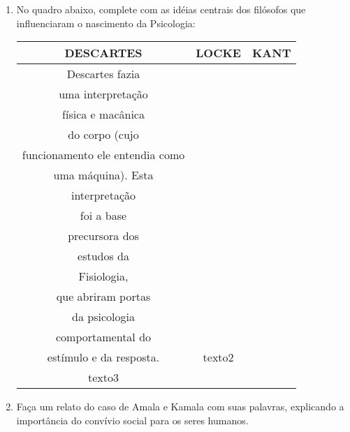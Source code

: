 \documentclass[a4paper, 12pt]{article}
\begin{document}
\begin{enumerate}
\item No quadro abaixo, complete com as idéias centrais dos filósofos que influenciaram o nascimento da Psicologia: \newline \newline
  \centering
  \begin{tabular}{|c|c|c|}
    \hline
    \textbf{DESCARTES} & \textbf{LOCKE} & \textbf{KANT} \\ \hline
    Descartes fazia \\
    uma interpretação \\
    física e macânica \\
    do corpo (cujo  \\
    funcionamento ele
    entendia como   \\
    uma máquina). Esta\\
    interpretação  \\
    foi a base \\
    precursora dos \\
    estudos da \\
    Fisiologia, \\
    que abriram portas \\
    da psicologia \\
    comportamental do   \\
    estímulo e da resposta. & texto2 &\\
    texto3 \\ \hline
  \end{tabular} \newline
  
\item Faça um relato do caso de Amala e Kamala com suas palavras, explicando a importância do convívio social para os seres humanos.
\end{enumerate}
\end{document}
